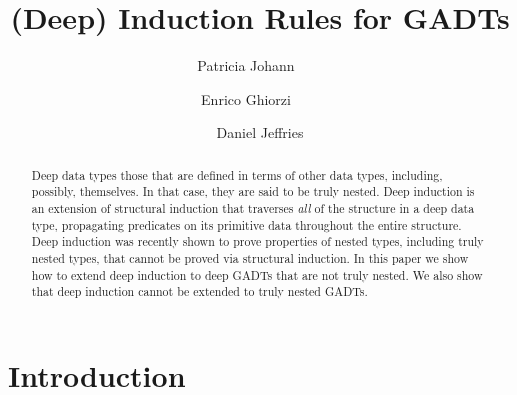 \documentclass[9pt]{entcs}
\begin{document}
\begin{frontmatter}
  \vspace*{-0.1in}
  \title{(Deep) Induction Rules for GADTs\vspace*{-0.1in}}
  \author{Patricia Johann~~~~}%
  \author{Enrico Ghiorzi~~~~}%
  \author{Daniel Jeffries}%
  \address{$\mathtt{\{johannp,ghiorzie,jeffriesd\}@appstate.edu}$\\
    Appalachian State University}

\vspace*{-0.1in}

\begin{abstract} 
  Deep data types those that are defined in terms of other data types,
  including, possibly, themselves.  In that case, they are said to be
  truly nested.  Deep induction is an extension of structural
  induction that traverses {\em all} of the structure in a deep data
  type, propagating predicates on its primitive data throughout the
  entire structure.  Deep induction was recently shown to prove
  properties of nested types, including truly nested types, that
  cannot be proved via structural induction.  In this paper we show
  how to extend deep induction to deep GADTs that are not truly
  nested. We also show that deep induction cannot be extended to truly
  nested GADTs.
\end{abstract}


\end{frontmatter}

\vspace*{-0.1in}

\section{Introduction}\label{sec:intro}

\end{document}
